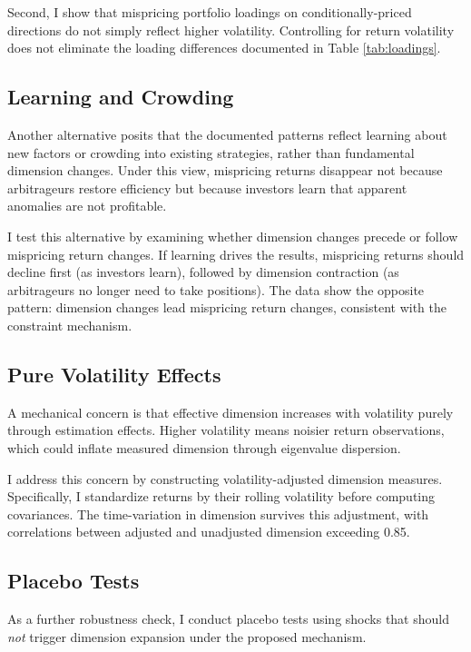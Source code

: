 \documentclass[12pt,letterpaper]{article}
\theoremstyle{plain}
\theoremstyle{definition}
\begin{document}
Second, I show that mispricing portfolio loadings on conditionally-priced directions do not simply reflect higher volatility. Controlling for return volatility does not eliminate the loading differences documented in Table \ref{tab:loadings}.

\subsection{Learning and Crowding}\label{subsec:alt_learning}

Another alternative posits that the documented patterns reflect learning about new factors or crowding into existing strategies, rather than fundamental dimension changes. Under this view, mispricing returns disappear not because arbitrageurs restore efficiency but because investors learn that apparent anomalies are not profitable.

I test this alternative by examining whether dimension changes precede or follow mispricing return changes. If learning drives the results, mispricing returns should decline first (as investors learn), followed by dimension contraction (as arbitrageurs no longer need to take positions). The data show the opposite pattern: dimension changes lead mispricing return changes, consistent with the constraint mechanism.

\subsection{Pure Volatility Effects}\label{subsec:alt_volatility}

A mechanical concern is that effective dimension increases with volatility purely through estimation effects. Higher volatility means noisier return observations, which could inflate measured dimension through eigenvalue dispersion.

I address this concern by constructing volatility-adjusted dimension measures. Specifically, I standardize returns by their rolling volatility before computing covariances. The time-variation in dimension survives this adjustment, with correlations between adjusted and unadjusted dimension exceeding 0.85.

\subsection{Placebo Tests}\label{subsec:placebo}

As a further robustness check, I conduct placebo tests using shocks that should \textit{not} trigger dimension expansion under the proposed mechanism.
\end{document}
